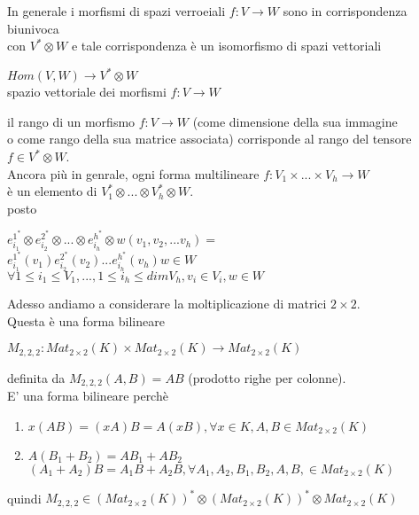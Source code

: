 \documentclass[a4paper,12pt]{article}
\theoremstyle{def}
\theoremstyle{prop}
\theoremstyle{esempio}
\theoremstyle{dimostrazione}
\theoremstyle{teo}
\theoremstyle{osservazione}
\begin{document}
In generale i morfismi di spazi verroeiali \(f: V \rightarrow W\) sono in corrispondenza biunivoca\\
con \(V^* \otimes W\) e tale corrispondenza è un isomorfismo di spazi vettoriali
\begin{center}
	\(Hom(V, W) \rightarrow V^* \otimes W\)\\
	spazio vettoriale dei morfismi \(f: V \rightarrow W\)
\end{center}
il rango di un morfismo \(f: V \rightarrow W\) (come dimensione della sua immagine \\
o come rango della sua matrice associata) corrisponde al rango del tensore \(f \in V^* \otimes W\).\vspace{\baselineskip}\\
Ancora più in genrale, ogni forma multilineare \(f: V_1 \times ... \times V_h \rightarrow W\)\\
è un elemento di \(V_1^* \otimes ... \otimes V_h^* \otimes W\).\\
posto
\begin{center}
	\(e_{i_1}^{1^*} \otimes e_{i_2}^{2^*} \otimes ... \otimes e_{i_h}^{h^*} \otimes w (v_1, v_2, ... v_h) = \)\\
	\(e_{i_1}^{1^*}(v_1)e_{i_2}^{2^*}(v_2) ... e_{i_h}^{h^*}(v_h)w \in W\)\\
	\(\forall 1 \leq i_1 \leq V_1, ..., 1 \leq i_h \leq dim V_h, v_i \in V_i, w \in W\)\vspace{\baselineskip}
\end{center}
Adesso andiamo a considerare la moltiplicazione di matrici \(2 \times 2\).\\
Questa è una forma bilineare 
\begin{center}
	\(M_{2,2,2} : Mat_{2 \times 2} (K) \times Mat_{2 \times 2} (K) \rightarrow Mat_{2 \times 2} (K)\)
\end{center}
definita da \(M_{2,2,2}(A,B)= AB\) (prodotto righe per colonne).\\
E' una forma bilineare perchè
\begin{enumerate}
	\item \(x(AB) = (xA)B = A(xB), \forall x \in K, A,B \in Mat_{2 \times 2} (K)\)
	\item \(A(B_1 + B_2) = AB_1 + AB_2\)\\
	      \((A_1 + A_2)B = A_1B + A_2B, \forall A_1, A_2, B_1, B_2, A, B, \in Mat_{2 \times 2} (K)\)
\end{enumerate}
quindi \(M_{2,2,2} \in (Mat_{2 \times 2} (K))^* \otimes (Mat_{2 \times 2} (K))^* \otimes Mat_{2 \times 2} (K)\)\\
\end{document}

